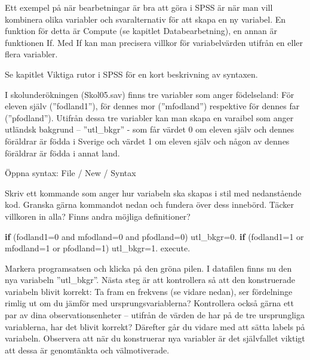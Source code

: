 \documentclass[
]{book}
\newenvironment{Shaded}{\begin{snugshade}}{\end{snugshade}}
\newcommand{\AttributeTok}[1]{\textcolor[rgb]{0.13,0.29,0.53}{#1}}
\newcommand{\ControlFlowTok}[1]{\textcolor[rgb]{0.13,0.29,0.53}{\textbf{#1}}}
\newcommand{\DecValTok}[1]{\textcolor[rgb]{0.00,0.00,0.81}{#1}}
\newcommand{\FloatTok}[1]{\textcolor[rgb]{0.00,0.00,0.81}{#1}}
\newcommand{\NormalTok}[1]{#1}
\newcommand{\OtherTok}[1]{\textcolor[rgb]{0.56,0.35,0.01}{#1}}
\begin{document}
Ett exempel på när bearbetningar är bra att göra i SPSS är när man vill kombinera olika variabler och
svaralternativ för att skapa en ny variabel. En funktion för detta är Compute (se kapitlet Databearbetning), en annan är funktionen If. Med If kan man precisera villkor för variabelvärden utifrån en eller flera variabler.

Se kapitlet Viktiga rutor i SPSS för en kort beskrivning av syntaxen.

I skolunderökningen (Skol05.sav) finns tre variabler som anger födelseland: För eleven själv
(''fodland1''), för dennes mor (''mfodland'') respektive för dennes far (''pfodland''). Utifrån dessa tre
variabler kan man skapa en varaibel som anger utländsk bakgrund -- ''utl\_bkgr'' - som får värdet 0 om
eleven själv och dennes föräldrar är födda i Sverige och värdet 1 om eleven själv och någon av dennes
föräldrar är födda i annat land.

Öppna syntax: File / New / Syntax

Skriv ett kommande som anger hur variabeln ska skapas i stil med nedanstående kod. Granska gärna kommandot nedan och fundera över dess innebörd. Täcker villkoren in alla? Finns andra möjliga definitioner?

\begin{Shaded}
\begin{Highlighting}[]
\ControlFlowTok{if}\NormalTok{ (}\AttributeTok{fodland1=}\DecValTok{0}\NormalTok{ and }\AttributeTok{mfodland=}\DecValTok{0}\NormalTok{ and }\AttributeTok{pfodland=}\DecValTok{0}\NormalTok{) utl\_bkgr}\OtherTok{=}\FloatTok{0.}
\ControlFlowTok{if}\NormalTok{ (}\AttributeTok{fodland1=}\DecValTok{1}\NormalTok{ or }\AttributeTok{mfodland=}\DecValTok{1}\NormalTok{ or }\AttributeTok{pfodland=}\DecValTok{1}\NormalTok{) utl\_bkgr}\OtherTok{=}\FloatTok{1.}
\NormalTok{execute.}
\end{Highlighting}
\end{Shaded}

Markera programsatsen och klicka på den gröna pilen. I datafilen finns nu den nya variabeln ''utl\_bkgr''. Nästa steg är att kontrollera så att den konstruerade
variabeln blivit korrekt: Ta fram en frekvens (se vidare nedan), ser fördelninge rimlig ut om du jämför
med ursprungsvariablerna? Kontrollera också gärna ett par av dina observationsenheter -- utifrån de
värden de har på de tre ursprungliga variablerna, har det blivit korrekt? Därefter går du vidare med att
sätta labels på variabeln. Observera att när du konstruerar nya variabler är det självfallet viktigt att dessa är genomtänkta och välmotiverade.
\end{document}
